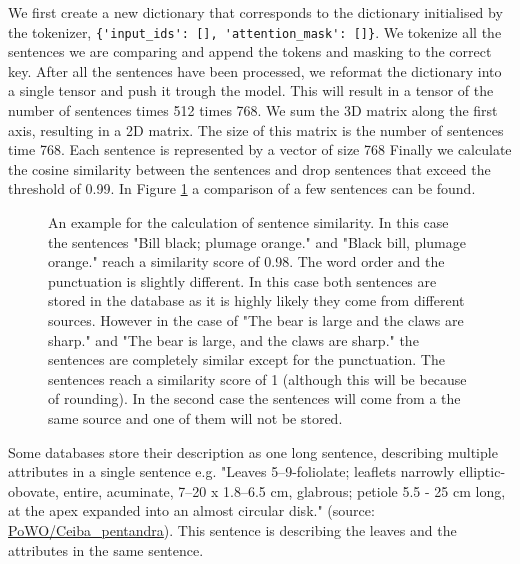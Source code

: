\documentclass[a4paper, 12pt, oneside]{book} %
\begin{document}
We first create a new dictionary that corresponds to the dictionary initialised by the tokenizer, \verb|{'input_ids': [], 'attention_mask': []}|.
We tokenize all the sentences we are comparing and append the tokens and masking to the correct key.
After all the sentences have been processed, we reformat the dictionary into a single tensor and push it trough the model.
This will result in a tensor of the number of sentences times 512 times 768. 
We sum the 3D matrix along the first axis, resulting in a 2D matrix.
The size of this matrix is the number of sentences time 768.
Each sentence is represented by a vector of size 768
Finally we calculate the cosine similarity between the sentences and drop sentences that exceed the threshold of 0.99.
In Figure \ref{fig:similarity_matrix} a comparison of a few sentences can be found.
\begin{figure} [htbp]
    \centering
    \vspace{0cm}
    \hspace{-1cm}
    \makebox[\textwidth][c]{}
    \caption[Example of sentence similarity]{An example for the calculation of sentence similarity. 
    In this case the sentences "Bill black; plumage orange." and "Black bill, plumage orange." reach a similarity score of 0.98. The word order and the punctuation is slightly different. In this case both sentences are stored in the database as it is highly likely they come from different sources. However in the case of "The bear is large and the claws are sharp." and "The bear is large, and the claws are sharp." the sentences are completely similar except for the punctuation. The sentences reach a similarity score of 1 (although this will be because of rounding). In the second case the sentences will come from a the same source and one of them will not be stored.}
    \label{fig:similarity_matrix}
\end{figure}

Some databases store their description as one long sentence, describing multiple attributes in a single sentence e.g. "Leaves 5–9-foliolate; leaflets narrowly elliptic-obovate, entire, acuminate, 7–20 x 1.8–6.5 cm, glabrous; petiole 5.5 - 25 cm long, at the apex expanded into an almost circular disk." (source: \href{http://powo.science.kew.org/taxon/urn:lsid:ipni.org:names:1166232-2}{PoWO/Ceiba\_pentandra}). 
This sentence is describing the leaves and the attributes in the same sentence. 
\end{document}

